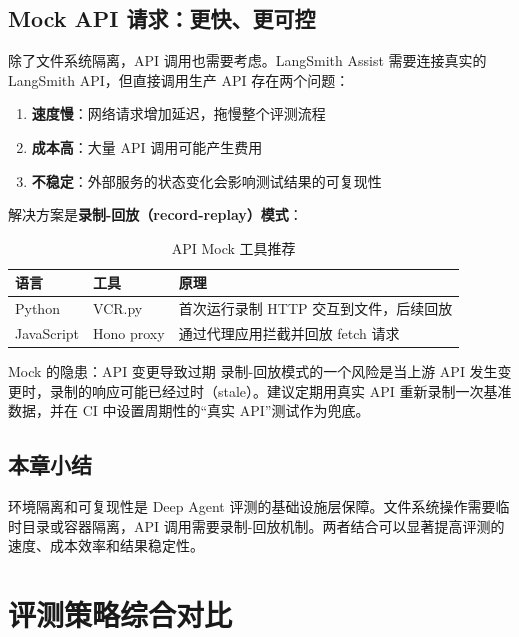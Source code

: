 \documentclass[a4paper]{article}
\begin{document}
\subsection{Mock API 请求：更快、更可控}

除了文件系统隔离，API 调用也需要考虑。LangSmith Assist 需要连接真实的 LangSmith API，但直接调用生产 API 存在两个问题：

\begin{enumerate}
  \item \textbf{速度慢}：网络请求增加延迟，拖慢整个评测流程
  \item \textbf{成本高}：大量 API 调用可能产生费用
  \item \textbf{不稳定}：外部服务的状态变化会影响测试结果的可复现性
\end{enumerate}

解决方案是\textbf{录制-回放（record-replay）模式}：

\begin{table}[H]
\centering
\caption{API Mock 工具推荐}
\begin{tabular}{llp{7cm}}
\toprule
\textbf{语言} & \textbf{工具} & \textbf{原理} \\
\midrule
Python & VCR.py & 首次运行录制 HTTP 交互到文件，后续回放 \\
JavaScript & Hono proxy & 通过代理应用拦截并回放 fetch 请求 \\
\bottomrule
\end{tabular}
\end{table}

\begin{warningbox}{Mock 的隐患：API 变更导致过期}
录制-回放模式的一个风险是当上游 API 发生变更时，录制的响应可能已经过时（stale）。建议定期用真实 API 重新录制一次基准数据，并在 CI 中设置周期性的``真实 API''测试作为兜底。
\end{warningbox}

\subsection{本章小结}

环境隔离和可复现性是 Deep Agent 评测的基础设施层保障。文件系统操作需要临时目录或容器隔离，API 调用需要录制-回放机制。两者结合可以显著提高评测的速度、成本效率和结果稳定性。


\section{评测策略综合对比}
\end{document}
